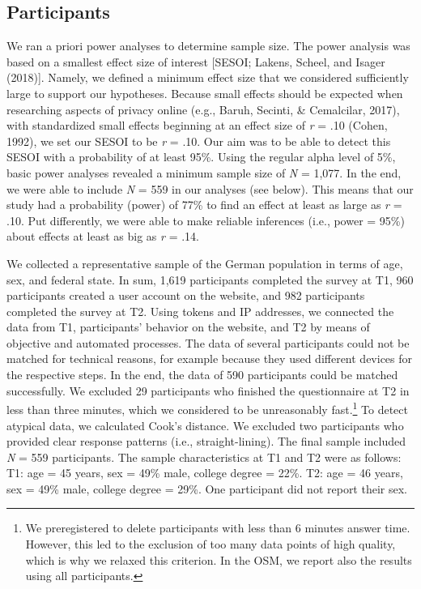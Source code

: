 \documentclass[
  english,
  man,floatsintext]{apa6}
\begin{document}
\hypertarget{participants}{%
\subsection{Participants}\label{participants}}

We ran a priori power analyses to determine sample size.
The power analysis was based on a smallest effect size of interest {[}SESOI; Lakens, Scheel, and Isager (2018){]}.
Namely, we defined a minimum effect size that we considered sufficiently large to support our hypotheses.
Because small effects should be expected when researching aspects of privacy online (e.g., Baruh, Secinti, \& Cemalcilar, 2017), with standardized small effects beginning at an effect size of \emph{r} = .10 (Cohen, 1992), we set our SESOI to be \emph{r} = .10.
Our aim was to be able to detect this SESOI with a probability of at least 95\%. Using the regular alpha level of 5\%, basic power analyses revealed a minimum sample size of \emph{N} = 1,077.
In the end, we were able to include \emph{N} = 559 in our analyses (see below).
This means that our study had a probability (power) of 77\% to find an effect at least as large as \emph{r} = .10.
Put differently, we were able to make reliable inferences (i.e., power = 95\%) about effects at least as big as \emph{r} = .14.

We collected a representative sample of the German population in terms of age, sex, and federal state.
In sum, 1,619 participants completed the survey at T1, 960 participants created a user account on the website, and 982 participants completed the survey at T2.
Using tokens and IP addresses, we connected the data from T1, participants' behavior on the website, and T2 by means of objective and automated processes.
The data of several participants could not be matched for technical reasons, for example because they used different devices for the respective steps.
In the end, the data of 590 participants could be matched successfully.
We excluded 29 participants who finished the questionnaire at T2 in less than three minutes, which we considered to be unreasonably fast.\footnote{We preregistered to delete participants with less than 6 minutes answer time. However, this led to the exclusion of too many data points of high quality, which is why we relaxed this criterion. In the OSM, we report also the results using all participants.}
To detect atypical data, we calculated Cook's distance.
We excluded two participants who provided clear response patterns (i.e., straight-lining).
The final sample included \emph{N} = 559 participants.
The sample characteristics at T1 and T2 were as follows:
T1: age = 45 years, sex = 49\% male, college degree = 22\%.
T2: age = 46 years, sex = 49\% male, college degree = 29\%.
One participant did not report their sex.
\end{document}
